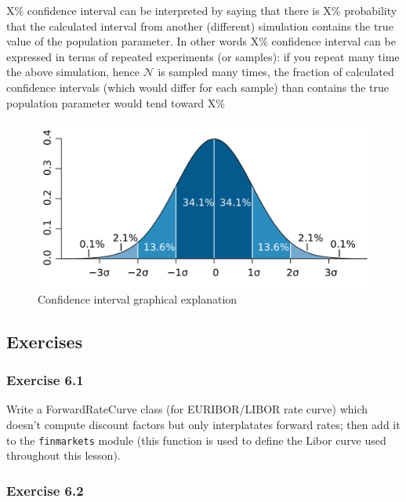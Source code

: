 \documentclass[11pt]{article}
\begin{document}
X\% confidence interval can be interpreted by saying that there is X\%
probability that the calculated interval from another (different)
simulation contains the true value of the population parameter. In other
words X\% confidence interval can be expressed in terms of repeated
experiments (or samples): if you repeat many time the above simulation,
hence \(\mathcal{N}\) is sampled many times, the fraction of calculated
confidence intervals (which would differ for each sample) than contains
the true population parameter would tend toward X\%

\begin{figure}
\centering
\includegraphics{Standard_deviation_diagram.svg.png}
\caption{Confidence interval graphical explanation}
\end{figure}

    \hypertarget{exercises}{%
\subsection{Exercises}\label{exercises}}

\hypertarget{exercise-6.1}{%
\subsubsection{Exercise 6.1}\label{exercise-6.1}}

Write a ForwardRateCurve class (for EURIBOR/LIBOR rate curve) which
doesn't compute discount factors but only interplatates forward rates;
then add it to the \texttt{finmarkets} module (this function is used to
define the Libor curve used throughout this lesson).

    \hypertarget{exercise-6.2}{%
\subsubsection{Exercise 6.2}\label{exercise-6.2}}
\end{document}
